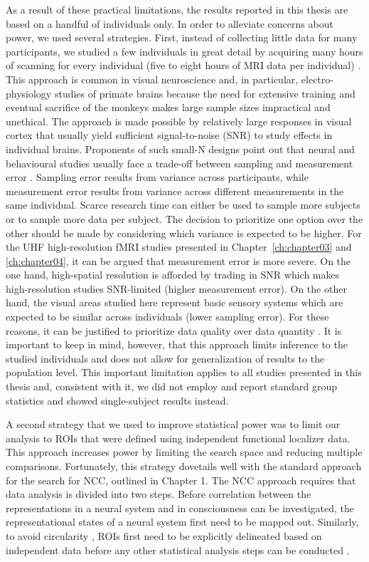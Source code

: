 As a result of these practical limitations, the results reported in this thesis are based on a handful of individuals only. In order to alleviate concerns about power, we used several strategies. First, instead of collecting little data for many participants, we studied a few individuals in great detail by acquiring many hours of scanning for every individual (five to eight hours of MRI data per individual) \parencite{Poldrack2017b}. This approach is common in visual neuroscience and, in particular, electro-physiology studies of primate brains because the need for extensive training and eventual sacrifice of the monkeys makes large sample sizes impractical and unethical. The approach is made possible by relatively large responses in visual cortex that usually yield sufficient signal-to-noise (SNR) to study effects in individual brains. Proponents of such small-N designs point out that neural and behavioural studies usually face a trade-off between sampling and measurement error \parencite{Kolossa2018, Smith2018}. Sampling error results from variance across participants, while measurement error results from variance across different measurements in the same individual. Scarce research time can either be used to sample more subjects or to sample more data per subject. The decision to prioritize one option over the other should be made by considering which variance is expected to be higher. For the UHF high-resolution fMRI studies presented in Chapter~\ref{ch:chapter03} and \ref{ch:chapter04}, it can be argued that measurement error is more severe. On the one hand, high-spatial resolution is afforded by trading in SNR which makes high-resolution studies SNR-limited (higher measurement error). On the other hand, the visual areas studied here represent basic sensory systems which are expected to be similar across individuals (lower sampling error). For these reasons, it can be justified to prioritize data quality over data quantity \parencite{Kolossa2018}. It is important to keep in mind, however, that this approach limits inference to the studied individuals and does not allow for generalization of results to the population level. This important limitation applies to all studies presented in this thesis and, consistent with it, we did not employ and report standard group statistics and showed single-subject results instead.

A second strategy that we used to improve statistical power was to limit our analysis to ROIs that were defined using independent functional localizer data. This approach increases power by limiting the search space and reducing multiple comparisons. Fortunately, this strategy dovetails well with the standard approach for the search for NCC, outlined in Chapter 1. The NCC approach requires that data analysis is divided into two steps. Before correlation between the representations in a neural system and in consciousness can be investigated, the representational states of a neural system first need to be mapped out. Similarly, to avoid circularity \parencite{Kriegeskorte2009}, ROIs first need to be explicitly delineated based on independent data before any other statistical analysis steps can be conducted \parencite{Poldrack2017a}.

